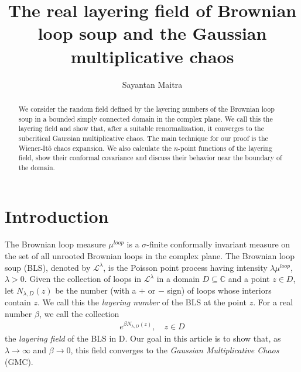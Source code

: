 \documentclass[a4paper, 11pt, reqno]{amsart}
\theoremstyle{definition} \newtheorem{defn}{Definition}[section]
\theoremstyle{remark} \newtheorem{rem}[defn]{Remark}
\theoremstyle{remark} \newtheorem*{rem*}{Remark}
\theoremstyle{plain} \newtheorem{thm}[defn]{Theorem}
\theoremstyle{plain} \newtheorem{lem}[defn]{Lemma}
\theoremstyle{plain} \newtheorem{prop}[defn]{Proposition}
\theoremstyle{plain} \newtheorem{cor}[defn]{Corollary}
\theoremstyle{remark} \newtheorem{exm}[defn]{\textbf{Example}}
\theoremstyle{remark} \newtheorem{exms}[defn]{\textbf{Examples}}
\theoremstyle{remark} \newtheorem*{bl}{}
\numberwithin{equation}{section} %
\newcommand{\mc}{\mathcal}
\newcommand{\C}{\mathbb{C}}
\begin{document}
	\title[Real layering field of Brownian loop soup]{The real layering field of Brownian loop soup and the Gaussian multiplicative chaos}


    \author{Sayantan Maitra}

    \address{Division of Science, New York University Abu Dhabi, Abu Dhabi, United Arab Emirates.}

	
	

   
    


    \begin{abstract}
        We consider the random field defined by the layering numbers of the Brownian loop soup in a bounded simply connected domain in the complex plane. We call this the layering field and show that, after a suitable renormalization, it converges to the subcritical Gaussian multiplicative chaos. The main technique for our proof is the Wiener-It\^{o} chaos expansion. We also calculate the $n$-point functions of the layering field, show their conformal covariance and discuss their behavior near the boundary of the domain. 
    \end{abstract}
    
	\maketitle
	
	\section{Introduction}

    The Brownian loop measure $\mu^{loop}$ is a $\sigma$-finite conformally invariant  measure on the set of all unrooted Brownian loops in the complex plane. The Brownian loop soup (BLS), denoted by $\mc{L}^{\lambda}$, is the Poisson point process having intensity $\lambda \mu^{loop}$, $\lambda>0$. Given the collection of loops in $\mc{L}^{\lambda}$ in a domain $D\subseteq \C$ and a point $z 
    \in D$, let $N_{\lambda, D}(z)$ be the number (with a $+$ or $-$ sign) of loops whose interiors contain $z$. We call this the \textit{layering number} of the BLS at the point $z$. For a  real number $\beta$, we call the collection 
    \begin{align}\label{eq:layering_field_0}
        e^{\beta N_{\lambda, D}(z)}, \quad z \in D
    \end{align}
    the \textit{layering field} of the BLS in D. Our goal in this article is to show that, as $\lambda \to \infty$ and $\beta \to 0$, this field converges to the \textit{Gaussian Multiplicative Chaos} (GMC). 
    
\end{document}
